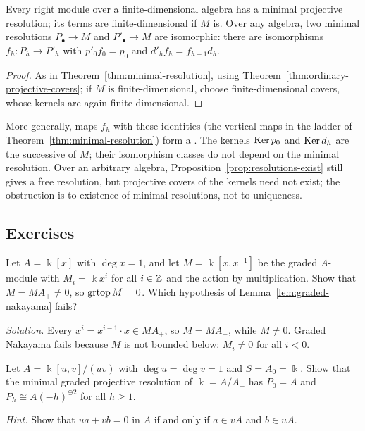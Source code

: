 \begin{advanced}
\begin{theorem}\label{thm:ordinary-minimal-resolutions}
Every right module over a finite-dimensional algebra has a minimal projective resolution; its terms are finite-dimensional if $M$ is.
Over any algebra, two minimal resolutions $P_\bullet\to M$ and $P'_\bullet\to M$ are isomorphic: there are isomorphisms $f_h:P_h\to P'_h$ with $p'_0f_0=p_0$ and $d'_h f_h=f_{h-1}d_h$.
\end{theorem}

\begin{proof}
As in Theorem~\ref{thm:minimal-resolution}, using Theorem~\ref{thm:ordinary-projective-covers}; if $M$ is finite-dimensional, choose finite-dimensional covers, whose kernels are again finite-dimensional.
\end{proof}

More generally, maps $f_h$ with these identities (the vertical maps in the ladder of Theorem~\ref{thm:minimal-resolution}) form a .
The kernels $\operatorname{Ker}\nolimits p_0$ and $\operatorname{Ker}\nolimits d_h$ are the successive  of $M$; their isomorphism classes do not depend on the minimal resolution.
Over an arbitrary algebra, Proposition~\ref{prop:resolutions-exist} still gives a free resolution, but projective covers of the kernels need not exist; the obstruction is to existence of minimal resolutions, not to uniqueness.
\end{advanced}

\subsection{Exercises}

\begin{exercise}
Let $A=\Bbbk[x]$ with $\deg x=1$, and let $M=\Bbbk[x,x^{-1}]$ be the graded $A$-module with $M_i=\Bbbk x^i$ for all $i\in\mathbb{Z}$ and the action by multiplication.
Show that $M=MA_+\neq0$, so $\operatorname{grtop}\nolimits M=0$.
Which hypothesis of Lemma~\ref{lem:graded-nakayama} fails?
\end{exercise}

\begin{hidden}
\emph{Solution.}
Every $x^i=x^{i-1}\cdot x\in MA_+$, so $M=MA_+$, while $M\neq0$.
Graded Nakayama fails because $M$ is not bounded below: $M_i\neq0$ for all $i<0$.
\end{hidden}


\begin{exercise}
Let $A=\Bbbk[u,v]/(uv)$ with $\deg u=\deg v=1$ and $S=A_0=\Bbbk$.
Show that the minimal graded projective resolution of $\Bbbk=A/A_+$ has $P_0=A$ and $P_h\cong A(-h)^{\oplus2}$ for all $h\geq1$.

\emph{Hint.} Show that $ua+vb=0$ in $A$ if and only if $a\in vA$ and $b\in uA$.
\end{exercise}

